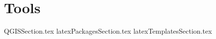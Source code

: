 \documentclass[class=report , crop=false, multi={itemize, figure}, float=false]{standalone}
\begin{document}
\chapter{Tools}

{QGISSection.tex}
{latexPackagesSection.tex}
{latexTemplatesSection.tex}
\end{document}
